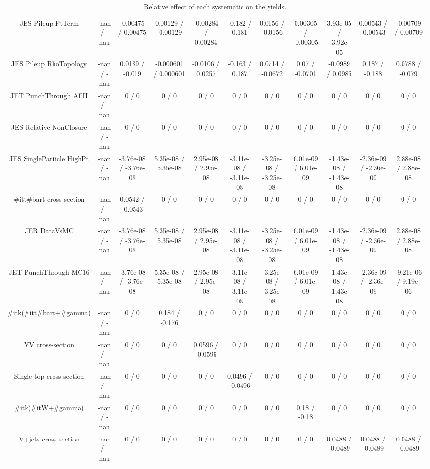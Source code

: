 \begin{table}[htbp]
\begin{center}
\begin{tabular}{|c|c|c|c|c|c|c|c|c|c|c|}
  JES Pileup PtTerm & -nan / -nan & -0.00475 / 0.00475 & 0.00129 / -0.00129 & -0.00284 / 0.00284 & -0.182 / 0.181 & 0.0156 / -0.0156 & 0.00305 / -0.00305 & 3.93e-05 / -3.92e-05 & 0.00543 / -0.00543 & -0.00709 / 0.00709 \\ 
  JES Pileup RhoTopology & -nan / -nan & 0.0189 / -0.019 & -0.000601 / 0.000601 & -0.0106 / 0.0257 & -0.163 / 0.187 & 0.0714 / -0.0672 & 0.07 / -0.0701 & -0.0989 / 0.0985 & 0.187 / -0.188 & 0.0788 / -0.079 \\ 
  JET PunchThrough AFII & -nan / -nan & 0 / 0 & 0 / 0 & 0 / 0 & 0 / 0 & 0 / 0 & 0 / 0 & 0 / 0 & 0 / 0 & 0 / 0 \\ 
  JES Relative NonClosure & -nan / -nan & 0 / 0 & 0 / 0 & 0 / 0 & 0 / 0 & 0 / 0 & 0 / 0 & 0 / 0 & 0 / 0 & 0 / 0 \\ 
  JES SingleParticle HighPt & -nan / -nan & -3.76e-08 / -3.76e-08 & 5.35e-08 / 5.35e-08 & 2.95e-08 / 2.95e-08 & -3.11e-08 / -3.11e-08 & -3.25e-08 / -3.25e-08 & 6.01e-09 / 6.01e-09 & -1.43e-08 / -1.43e-08 & -2.36e-09 / -2.36e-09 & 2.88e-08 / 2.88e-08 \\ 
  #it{t#bar{t}} cross-section & -nan / -nan & 0.0542 / -0.0543 & 0 / 0 & 0 / 0 & 0 / 0 & 0 / 0 & 0 / 0 & 0 / 0 & 0 / 0 & 0 / 0 \\ 
  JER DataVsMC & -nan / -nan & -3.76e-08 / -3.76e-08 & 5.35e-08 / 5.35e-08 & 2.95e-08 / 2.95e-08 & -3.11e-08 / -3.11e-08 & -3.25e-08 / -3.25e-08 & 6.01e-09 / 6.01e-09 & -1.43e-08 / -1.43e-08 & -2.36e-09 / -2.36e-09 & 2.88e-08 / 2.88e-08 \\ 
  JET PunchThrough MC16 & -nan / -nan & -3.76e-08 / -3.76e-08 & 5.35e-08 / 5.35e-08 & 2.95e-08 / 2.95e-08 & -3.11e-08 / -3.11e-08 & -3.25e-08 / -3.25e-08 & 6.01e-09 / 6.01e-09 & -1.43e-08 / -1.43e-08 & -2.36e-09 / -2.36e-09 & -9.21e-06 / 9.19e-06 \\ 
  #it{k}(#it{t#bar{t}+#gamma}) & -nan / -nan & 0 / 0 & 0.184 / -0.176 & 0 / 0 & 0 / 0 & 0 / 0 & 0 / 0 & 0 / 0 & 0 / 0 & 0 / 0 \\ 
  VV cross-section & -nan / -nan & 0 / 0 & 0 / 0 & 0.0596 / -0.0596 & 0 / 0 & 0 / 0 & 0 / 0 & 0 / 0 & 0 / 0 & 0 / 0 \\ 
  Single top cross-section & -nan / -nan & 0 / 0 & 0 / 0 & 0 / 0 & 0.0496 / -0.0496 & 0 / 0 & 0 / 0 & 0 / 0 & 0 / 0 & 0 / 0 \\ 
  #it{k}(#it{W+#gamma}) & -nan / -nan & 0 / 0 & 0 / 0 & 0 / 0 & 0 / 0 & 0 / 0 & 0.18 / -0.18 & 0 / 0 & 0 / 0 & 0 / 0 \\ 
  V+jets cross-section & -nan / -nan & 0 / 0 & 0 / 0 & 0 / 0 & 0 / 0 & 0 / 0 & 0 / 0 & 0.0488 / -0.0489 & 0.0488 / -0.0489 & 0.0488 / -0.0489 \\ 
\hline 
\end{tabular} 
\caption{Relative effect of each systematic on the yields.} 
\end{center} 
\end{table} 

